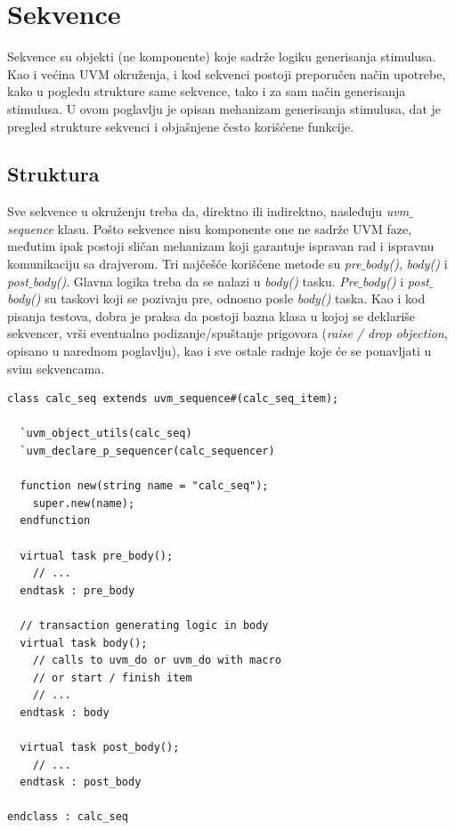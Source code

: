 
\section{Sekvence}

Sekvence su objekti (ne komponente) koje sadrže logiku generisanja stimulusa.
Kao i većina UVM okruženja, i kod sekvenci postoji preporučen način upotrebe,
kako u pogledu strukture same sekvence, tako i za sam način generisanja
stimulusa. U ovom poglavlju je opisan mehanizam generisanja stimulusa, dat je
pregled strukture sekvenci i objašnjene često korišćene funkcije.


\subsection{Struktura}

Sve sekvence u okruženju treba da, direktno ili indirektno, nasleđuju
\emph{uvm\(\_\)sequence} klasu. Pošto sekvence nisu komponente one ne sadrže UVM
faze, međutim ipak postoji sličan mehanizam koji garantuje ispravan rad i
ispravnu komunikaciju sa drajverom. Tri najčešće korišćene metode su
\emph{pre\(\_\)body()}, \emph{body()} i \emph{post\(\_\)body()}. Glavna logika
treba da se nalazi u \emph{body()} tasku. \emph{Pre\(\_\)body()} i
\emph{post\(\_\)body()} su taskovi koji se pozivaju pre, odnosno posle
\emph{body()} taska. Kao i kod pisanja testova, dobra je praksa da postoji bazna
klasa u kojoj se deklariše sekvencer, vrši eventualno podizanje/spuštanje
prigovora (\emph{raise / drop objection}, opisano u narednom poglavlju), kao i
sve ostale radnje koje će se ponavljati u svim sekvencama.

\begin{lstlisting}
class calc_seq extends uvm_sequence#(calc_seq_item);

  `uvm_object_utils(calc_seq)
  `uvm_declare_p_sequencer(calc_sequencer)

  function new(string name = "calc_seq");
    super.new(name);
  endfunction

  virtual task pre_body();
    // ...
  endtask : pre_body

  // transaction generating logic in body
  virtual task body();
    // calls to uvm_do or uvm_do with macro
    // or start / finish item
    // ...
  endtask : body

  virtual task post_body();
    // ...
  endtask : post_body

endclass : calc_seq
\end{lstlisting}

